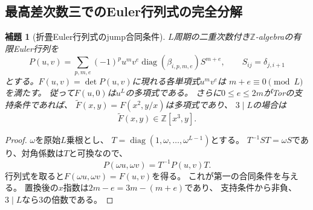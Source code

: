 \documentclass[11pt,a4paper]{ltjsarticle}
\newtheorem{lemma}[theorem]{補題}
\theoremstyle{definition}
\begin{document}
\subsection{最高差次数三でのEuler行列式の完全分解}

\begin{lemma}[折畳Euler行列式のjump合同条件]
\label{euler:lem:jump-congruence}
$L$周期の二重次数付き$\mathbb Z$-algebraの有限Euler行列を
\[
 P(u,v)=\sum_{p,m,e}(-1)^p u^mv^e
       \operatorname{diag}(\beta_{i,p,m,e})S^{m+e},
 \qquad S_{ij}=\delta_{j,i+1}
\]
とする。$F(u,v)=\det P(u,v)$に現れる各単項式$u^mv^e$は
$m+e\equiv0\pmod L$を満たす。
従って$F(u,0)$は$u^L$の多項式である。
さらに$0\le e\le2m$がTorの支持条件であれば、
$\widetilde F(x,y)=F(x^2,y/x)$は多項式であり、
$3\mid L$の場合は
\[
 \widetilde F(x,y)\in\mathbb Z[x^3,y].
\]
\end{lemma}
\begin{proof}
$\omega$を原始$L$乗根とし、
$T=\operatorname{diag}(1,\omega,\ldots,\omega^{L-1})$とする。
$T^{-1}ST=\omega S$であり、対角係数は$T$と可換なので、
\[
 P(\omega u,\omega v)=T^{-1}P(u,v)T.
\]
行列式を取ると$F(\omega u,\omega v)=F(u,v)$を得る。
これが第一の合同条件を与える。
置換後の$x$指数は$2m-e=3m-(m+e)$であり、
支持条件から非負、$3\mid L$なら3の倍数である。
\end{proof}
\end{document}
